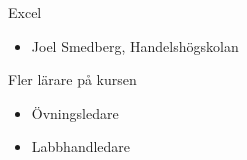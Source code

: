 \begin{frame}
  \begin{block}{Excel}
    \begin{itemize}
      \item Joel Smedberg, Handelshögskolan
    \end{itemize}
  \end{block}
\end{frame}

\begin{frame}
  \begin{block}{Fler lärare på kursen}
    \begin{itemize}
      \item Övningsledare
      \item Labbhandledare
    \end{itemize}
  \end{block}
\end{frame}

%
%


%


